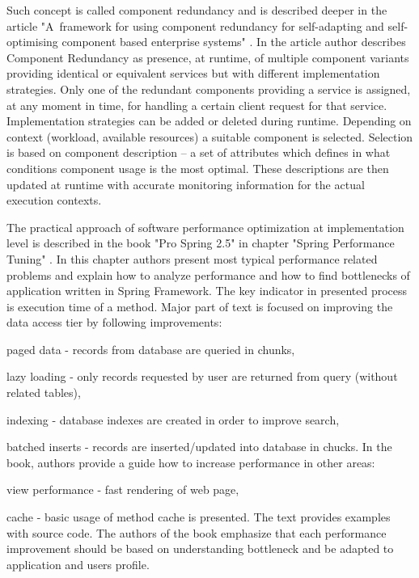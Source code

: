 \documentclass[12pt,a4paper]{article}
\let\tempone\itemize
\let\temptwo\enditemize
\renewenvironment{itemize}{\tempone\addtolength{\itemsep}{-0.4\baselineskip}}{\temptwo}
\begin{document}
Such concept is called component redundancy and is described deeper in the article "A~framework for using component redundancy for self-adapting and self-optimising component based enterprise systems" \cite{redundancycomponent}. In the article author describes Component Redundancy as presence, at runtime, of multiple  component  variants  providing  identical or equivalent services but with different implementation strategies. Only one of the redundant components providing a service is assigned, at any moment in time, for handling a certain client request for that  service.  Implementation strategies can be added or deleted during runtime. Depending on context (workload, available resources) a suitable component is selected. Selection is based on component description -- a set of attributes which defines in what conditions component usage is the most optimal. These descriptions are then updated at runtime with accurate monitoring information for the actual execution contexts. 

The practical approach of software performance optimization at implementation level is described in the book "Pro Spring 2.5" in chapter "Spring Performance Tuning" \cite{springperformance}. In this chapter authors present most typical performance related problems and explain how to analyze performance and how to find bottlenecks of application written in Spring Framework. The key indicator in presented process is execution time of a method. Major part of text is focused on improving the data access tier by following improvements:  
\begin{itemize}
\item paged data - records from database are queried in chunks, 
\item lazy loading - only records requested by user are returned from query (without related tables), 
\item indexing - database indexes are created in order to improve search, 
\item batched inserts - records are inserted/updated into database in chucks.
\end{itemize}
In the book, authors provide a guide how to increase performance in other areas:
\begin{itemize}
\item view performance - fast rendering of web page,
\item cache - basic usage of method cache is presented.
\end{itemize}
The text provides examples with source code. The authors of the book emphasize that each performance improvement should be based on understanding bottleneck and be adapted to application and users profile.  
\end{document}
